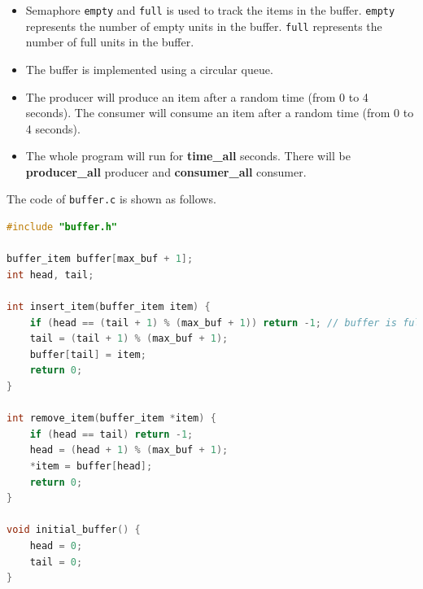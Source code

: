 \documentclass[UTF8,10pt,a4paper]{article}
\theoremstyle{Problem}
\theoremstyle{Solution}
\begin{document}
\begin{itemize}
    \item Semaphore \texttt{empty} and \texttt{full} is used to track the items in the buffer. \texttt{empty} represents the number of empty units in the buffer. \texttt{full} represents the number of full units in the buffer.
    
    \item The buffer is implemented using a circular queue.
    
    \item The producer will produce an item after a random time (from 0 to 4 seconds). The consumer will consume an item after a random time (from 0 to 4 seconds). 
    
    \item The whole program will run for \textbf{time\_all} seconds. There will be \textbf{producer\_all} producer and \textbf{consumer\_all} consumer.
\end{itemize}

The code of \texttt{buffer.c} is shown as follows.

\begin{lstlisting}[language = c ]
#include "buffer.h"

buffer_item buffer[max_buf + 1];
int head, tail;

int insert_item(buffer_item item) {
    if (head == (tail + 1) % (max_buf + 1)) return -1; // buffer is full
    tail = (tail + 1) % (max_buf + 1);
    buffer[tail] = item;
    return 0;
}

int remove_item(buffer_item *item) {
    if (head == tail) return -1;
    head = (head + 1) % (max_buf + 1);
    *item = buffer[head];
    return 0;
}

void initial_buffer() {
    head = 0;
    tail = 0;
}
\end{lstlisting}
\end{document}
